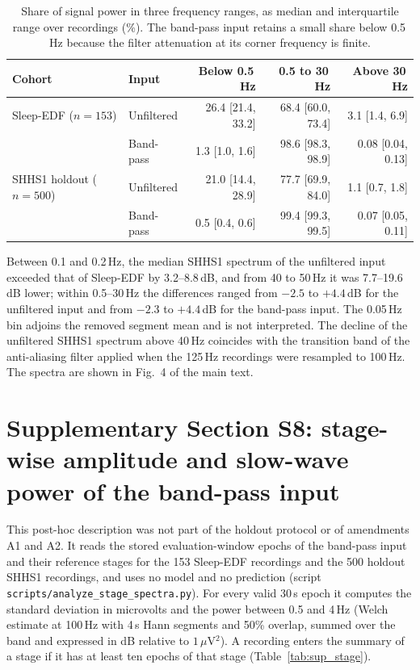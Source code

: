 \documentclass[10pt,a4paper]{article}
\begin{document}
\begin{table}[H]
\centering\small
\caption{Share of signal power in three frequency ranges, as median and interquartile range over
recordings (\%). The band-pass input retains a small share below 0.5\,Hz because the filter attenuation
at its corner frequency is finite.}
\label{tab:sup_psd}
\begin{tabular}{llrrr}
\toprule
Cohort & Input & Below 0.5\,Hz & 0.5 to 30\,Hz & Above 30\,Hz \\
\midrule
Sleep-EDF ($n=153$) & Unfiltered & 26.4 [21.4, 33.2] & 68.4 [60.0, 73.4] & 3.1 [1.4, 6.9] \\
 & Band-pass & 1.3 [1.0, 1.6] & 98.6 [98.3, 98.9] & 0.08 [0.04, 0.13] \\
SHHS1 holdout ($n=500$) & Unfiltered & 21.0 [14.4, 28.9] & 77.7 [69.9, 84.0] & 1.1 [0.7, 1.8] \\
 & Band-pass & 0.5 [0.4, 0.6] & 99.4 [99.3, 99.5] & 0.07 [0.05, 0.11] \\
\bottomrule
\end{tabular}
\end{table}

Between 0.1 and 0.2\,Hz, the median SHHS1 spectrum of the unfiltered input exceeded that of Sleep-EDF by
3.2--8.8\,dB, and from 40 to 50\,Hz it was 7.7--19.6\,dB lower; within 0.5--30\,Hz the differences ranged
from $-2.5$ to $+4.4$\,dB for the unfiltered input and from $-2.3$ to $+4.4$\,dB for the band-pass
input. The 0.05\,Hz bin adjoins the removed segment mean and is not interpreted. The decline of the
unfiltered SHHS1 spectrum above 40\,Hz coincides with the transition band of the anti-aliasing filter
applied when the 125\,Hz recordings were resampled to 100\,Hz. The spectra are shown in Fig.~4 of the
main text.

\section*{Supplementary Section S8: stage-wise amplitude and slow-wave power of the band-pass input}
\label{sec:sup_stage}

This post-hoc description was not part of the holdout protocol or of amendments A1 and A2. It reads the
stored evaluation-window epochs of the band-pass input and their reference stages for the 153 Sleep-EDF
recordings and the 500 holdout SHHS1 recordings, and uses no model and no prediction (script
\nolinkurl{scripts/analyze_stage_spectra.py}). For every valid 30\,s epoch it computes the standard
deviation in microvolts and the power between 0.5 and 4\,Hz (Welch estimate at 100\,Hz with 4\,s Hann
segments and 50\% overlap, summed over the band and expressed in dB relative to $1\,\mu$V$^2$). A
recording enters the summary of a stage if it has at least ten epochs of that stage
(Table~\ref{tab:sup_stage}).
\end{document}
